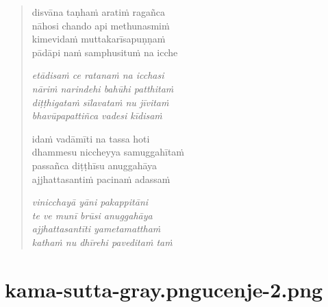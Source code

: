 

\cleartoverso

\vspace*{30mm}

\begin{verse}

disvāna taṇhaṁ aratiṁ ragañca\\
nāhosi chando api methunasmiṁ\\
kimevidaṁ muttakarīsapuṇṇaṁ\\
pādāpi naṁ samphusituṁ na icche

\emph{etādisaṁ ce ratanaṁ na icchasi}\\
\emph{nāriṁ narindehi bahūhi patthitaṁ}\\
\emph{diṭṭhigataṁ sīlavataṁ nu jīvitaṁ}\\
\emph{bhavūpapattiñca vadesi kīdisaṁ}

idaṁ vadāmīti na tassa hoti\\
dhammesu niccheyya samuggahītaṁ\\
passañca diṭṭhīsu anuggahāya\\
ajjhattasantiṁ pacinaṁ adassaṁ

\emph{vinicchayā yāni pakappitāni}\\
\emph{te ve munī brūsi anuggahāya}\\
\emph{ajjhattasantīti yametamatthaṁ}\\
\emph{kathaṁ nu dhīrehi paveditaṁ taṁ}

\end{verse}


\chapter[Māgaṇḍiya Sutta]{{kama-sutta-gray.png}{ucenje-2.png}}


